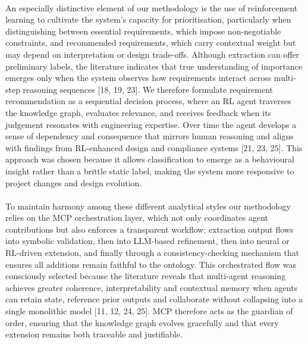         \paragraph{}
        An especially distinctive element of our methodology is the use of reinforcement learning to cultivate the system’s capacity for prioritisation, particularly when distinguishing between essential requirements, which impose non-negotiable constraints, and recommended requirements, which carry contextual weight but may depend on interpretation or design trade-offs. Although extraction can offer preliminary labels, the literature indicates that true understanding of importance emerges only when the system observes how requirements interact across multi-step reasoning sequences [18, 19, 23]. We therefore formulate requirement recommendation as a sequential decision process, where an RL agent traverses the knowledge graph, evaluates relevance, and receives feedback when its judgement resonates with engineering expertise. Over time the agent develops a sense of dependency and consequence that mirrors human reasoning and aligns with findings from RL-enhanced design and compliance systems [21, 23, 25]. This approach was chosen because it allows classification to emerge as a behavioural insight rather than a brittle static label, making the system more responsive to project changes and design evolution.

        \paragraph{}
        To maintain harmony among these different analytical styles our methodology relies on the MCP orchestration layer, which not only coordinates agent contributions but also enforces a transparent workflow: extraction output flows into symbolic validation, then into LLM-based refinement, then into neural or RL-driven extension, and finally through a consistency-checking mechanism that ensures all additions remain faithful to the ontology. This orchestrated flow was consciously selected because the literature reveals that multi-agent reasoning achieves greater coherence, interpretability and contextual memory when agents can retain state, reference prior outputs and collaborate without collapsing into a single monolithic model [11, 12, 24, 25]. MCP therefore acts as the guardian of order, ensuring that the knowledge graph evolves gracefully and that every extension remains both traceable and justifiable.

        \newpage
